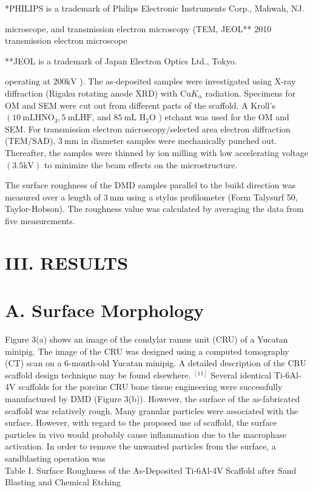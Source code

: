 \documentclass[10pt]{article}
\begin{document}
*PHILIPS is a trademark of Philips Electronic Instruments Corp., Mahwah, NJ.

microscope, and transmission electron microscopy (TEM, JEOL** 2010 transmission electron microscope

**JEOL is a trademark of Japan Electron Optics Ltd., Tokyo.

operating at $200 \mathrm{kV}$ ). The as-deposited samples were investigated using $\mathrm{X}$-ray diffraction (Rigaku rotating anode XRD) with $\mathrm{Cu} K_{\alpha}$ radiation. Specimens for OM and SEM were cut out from different parts of the scaffold. A Kroll's $\left(10 \mathrm{~mL} \mathrm{HNO}_{3}, 5 \mathrm{~mL} \mathrm{HF}\right.$, and $85 \mathrm{~mL}$ $\mathrm{H}_{2} \mathrm{O}$ ) etchant was used for the OM and SEM. For transmission electron microscopy/selected area electron diffraction (TEM/SAD), $3 \mathrm{~mm}$ in diameter samples were mechanically punched out. Thereafter, the samples were thinned by ion milling with low accelerating voltage $(3.5 \mathrm{kV})$ to minimize the beam effects on the microstructure.

The surface roughness of the DMD samples parallel to the build direction was measured over a length of $3 \mathrm{~mm}$ using a stylus profilometer (Form Talysurf 50, Taylor-Hobson). The roughness value was calculated by averaging the data from five measurements.

\section*{III. RESULTS}
\section*{A. Surface Morphology}
Figure 3(a) shows an image of the condylar ramus unit (CRU) of a Yucatan minipig. The image of the CRU was designed using a computed tomography (CT) scan on a 6-month-old Yucatan minipig. A detailed description of the CRU scaffold design technique may be found elsewhere. ${ }^{[11]}$ Several identical Ti-6Al-4V scaffolds for the porcine CRU bone tissue engineering were successfully manufactured by DMD (Figure 3(b)). However, the surface of the as-fabricated scaffold was relatively rough. Many granular particles were associated with the surface. However, with regard to the proposed use of scaffold, the surface particles in vivo would probably cause inflammation due to the macrophase activation. In order to remove the unwanted particles from the surface, a sandblasting operation was\\
Table I. Surface Roughness of the As-Deposited Ti-6Al-4V Scaffold after Sand Blasting and Chemical Etching
\end{document}
